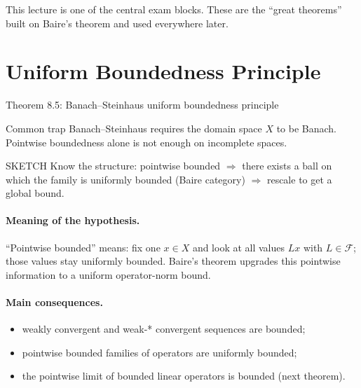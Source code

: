 \documentclass[header={Lecture 6 Exam Study Notes}]{study-note}
\begin{document}

\vspace{0.8em}

\begin{focusbox}
This lecture is one of the central exam blocks. These are the ``great theorems'' built on Baire's theorem and used everywhere later.
\end{focusbox}

\tableofcontents

\section{Uniform Boundedness Principle}

\begin{thmbox}{Theorem 8.5: Banach--Steinhaus uniform boundedness principle}
\thmBanachSteinhaus
\end{thmbox}

\begin{warningbox}{Common trap}
Banach--Steinhaus requires the domain space $X$ to be Banach. Pointwise boundedness alone is not enough on incomplete spaces.
\end{warningbox}

\begin{prooflevelbox}{SKETCH}
Know the structure: pointwise bounded $\Rightarrow$ there exists a ball on which the family is uniformly bounded (Baire category) $\Rightarrow$ rescale to get a global bound.
\end{prooflevelbox}

\paragraph{Meaning of the hypothesis.}
``Pointwise bounded'' means: fix one $x\in X$ and look at all values $Lx$ with $L\in\mathcal F$; those values stay uniformly bounded. Baire's theorem upgrades this pointwise information to a uniform operator-norm bound.

\paragraph{Main consequences.}
\begin{itemize}
\item weakly convergent and weak-* convergent sequences are bounded;
\item pointwise bounded families of operators are uniformly bounded;
\item the pointwise limit of bounded linear operators is bounded (next theorem).
\end{itemize}
\end{document}
